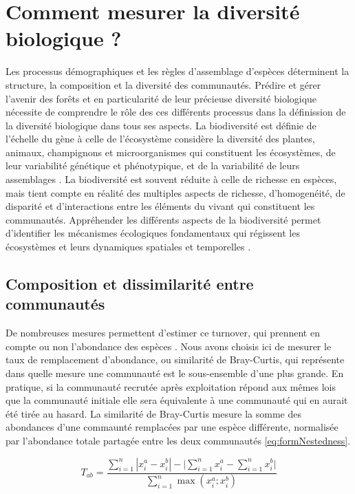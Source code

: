 \documentclass[
  11pt,
  french,
  A4paper,
  extrafontsizes,onecolumn,openright
  ]{memoir}
\begin{document}
\section{Comment mesurer la diversité biologique
?}\label{comment-mesurer-la-diversite-biologique}

Les processus démographiques et les règles d'assemblage d'espèces
déterminent la structure, la composition et la diversité des
communautés. Prédire et gérer l'avenir des forêts et en particularité de
leur précieuse diversité biologique nécessite de comprendre le rôle des
ces différents processus dans la définission de la diversité biologique
dans tous ses aspects. La biodiversité est définie de l'échelle du gène
à celle de l'écosystème considère la diversité des plantes, animaux,
champignons et microorganismes qui constituent les écosystèmes, de leur
variabilité génétique et phénotypique, et de la variabilité de leurs
assemblages \autocite{Loreau2005}. La biodiversité est souvent réduite à
celle de richesse en espèces, mais tient compte en réalité des multiples
aspects de richesse, d'homogenéité, de disparité et d'interactions entre
les éléments du vivant qui constituent les communautés. Appréhender les
différents aspects de la biodiversité permet d'identifier les mécanismes
écologiques fondamentaux qui régissent les écosystèmes et leurs
dynamiques spatiales et temporelles \autocites{Purvis2000}{Loreau2005}.

\subsection{Composition et dissimilarité entre
communautés}\label{composition-et-dissimilarite-entre-communautes}

De nombreuses mesures permettent d'estimer ce turnover, qui prennent en
compte ou non l'abondance des espèces \autocite{Podani2013}. Nous avons
choisis ici de mesurer le taux de remplacement d'abondance, ou
similarité de Bray-Curtis, qui représente dans quelle mesure une
communauté est le sous-ensemble d'une plus grande. En pratique, si la
communauté recrutée après exploitation répond aux mêmes lois que la
communauté initiale elle sera équivalente à une communauté qui en aurait
été tirée au hasard. La similarité de Bray-Curtis mesure la somme des
abondances d'une commaunté remplacées par une espèce différente,
normalisée par l'abondance totale partagée entre les deux communautés
\eqref{eq:formNestedness}.

\begin{equation}
T_{ab}=\frac{\sum_{i=1}^{n}|x_i^a - x_i^b| - \bigg| \sum_{i=1}^{n}{x_i^a} - \sum_{i=1}^{n}{x_i^b} \bigg|}{\sum_{i=1}^{n}\max{\left( x_i^a;x_i^b \right)}}
\label{eq:formNestedness}
\end{equation}
\end{document}
